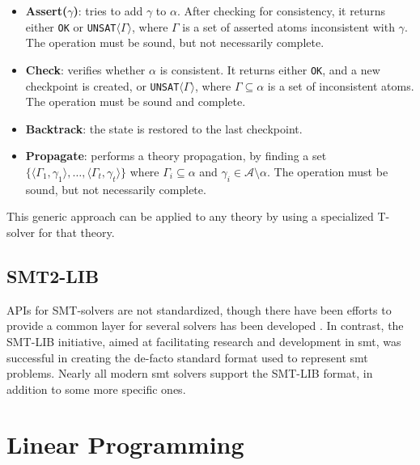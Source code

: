 \begin{itemize}
    \item \textbf{Assert($\gamma$)}: tries to add $\gamma$ to $\alpha$. After checking for consistency, it returns either \texttt{OK} or \texttt{UNSAT}$\langle{\Gamma}\rangle$, where $\Gamma$ is a set of asserted atoms inconsistent with $\gamma$. The operation must be sound, but not necessarily complete.
    \item \textbf{Check}: verifies whether $\alpha$ is consistent. It returns either \texttt{OK}, and a new checkpoint is created, or \texttt{UNSAT}$\langle{\Gamma}\rangle$, where $\Gamma \subseteq \alpha$ is a set of inconsistent atoms. The operation must be sound and complete.
    \item \textbf{Backtrack}: the state is restored to the last checkpoint.
    \item \textbf{Propagate}: performs a theory propagation, by finding a set $\{\langle \Gamma_1, \gamma_1 \rangle, \dots, \langle \Gamma_t, \gamma_t \rangle\}$ where $\Gamma_i \subseteq \alpha$ and $\gamma_i \in \mathcal{A} \setminus \alpha$. The operation must be sound, but not necessarily complete.
\end{itemize}

This generic approach can be applied to any theory by using a specialized T-solver for that theory.

\subsection*{SMT2-LIB}

APIs for SMT-solvers are not standardized, though there have been efforts to provide a common layer for several solvers has been developed \cite{repo:java-smt}.
In contrast, the SMT-LIB initiative, aimed at facilitating research and development in \gls{smt}, was successful in creating the de-facto standard format used to represent \gls{smt} problems.
Nearly all modern \gls{smt} solvers support the SMT-LIB format, in addition to some more specific ones.





\section{Linear Programming}

